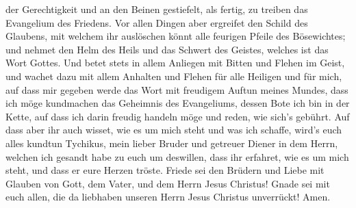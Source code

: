 der Gerechtigkeit  und an den Beinen gestiefelt, als
fertig, zu treiben das Evangelium des Friedens.  Vor allen
Dingen aber ergreifet den Schild des Glaubens, mit welchem ihr
auslöschen könnt alle feurigen Pfeile des Bösewichtes;  und
nehmet den Helm des Heils und das Schwert des Geistes, welches ist das
Wort Gottes.  Und betet stets in allem Anliegen mit Bitten
und Flehen im Geist, und wachet dazu mit allem Anhalten und Flehen für
alle Heiligen  und für mich, auf dass mir gegeben werde das
Wort mit freudigem Auftun meines Mundes, dass ich möge kundmachen das
Geheimnis des Evangeliums,  dessen Bote ich bin in der
Kette, auf dass ich darin freudig handeln möge und reden, wie sich's
gebührt.  Auf dass aber ihr auch wisset, wie es um mich
steht und was ich schaffe, wird's euch alles kundtun Tychikus, mein
lieber Bruder und getreuer Diener in dem Herrn,  welchen
ich gesandt habe zu euch um deswillen, dass ihr erfahret, wie es um mich
steht, und dass er eure Herzen tröste.  Friede sei den
Brüdern und Liebe mit Glauben von Gott, dem Vater, und dem Herrn Jesus
Christus!  Gnade sei mit euch allen, die da liebhaben
unseren Herrn Jesus Christus unverrückt! Amen.

